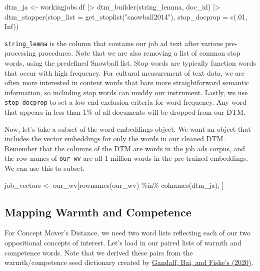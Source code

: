 \documentclass[
  letterpaper,
  DIV=11,
  numbers=noendperiod]{scrreprt}
\newenvironment{Shaded}{\begin{snugshade}}{\end{snugshade}}
\newcommand{\AttributeTok}[1]{\textcolor[rgb]{0.40,0.45,0.13}{#1}}
\newcommand{\ConstantTok}[1]{\textcolor[rgb]{0.56,0.35,0.01}{#1}}
\newcommand{\DecValTok}[1]{\textcolor[rgb]{0.68,0.00,0.00}{#1}}
\newcommand{\FunctionTok}[1]{\textcolor[rgb]{0.28,0.35,0.67}{#1}}
\newcommand{\NormalTok}[1]{\textcolor[rgb]{0.00,0.23,0.31}{#1}}
\newcommand{\OtherTok}[1]{\textcolor[rgb]{0.00,0.23,0.31}{#1}}
\newcommand{\SpecialCharTok}[1]{\textcolor[rgb]{0.37,0.37,0.37}{#1}}
\newcommand{\StringTok}[1]{\textcolor[rgb]{0.13,0.47,0.30}{#1}}
\begin{document}
\begin{Shaded}
\begin{Highlighting}[]
\NormalTok{dtm\_ja }\OtherTok{\textless{}{-}}\NormalTok{ workingjobs.df }\SpecialCharTok{|\textgreater{}}
  \FunctionTok{dtm\_builder}\NormalTok{(string\_lemma, doc\_id) }\SpecialCharTok{|\textgreater{}}
  \FunctionTok{dtm\_stopper}\NormalTok{(}\AttributeTok{stop\_list =} \FunctionTok{get\_stoplist}\NormalTok{(}\StringTok{"snowball2014"}\NormalTok{),}
              \AttributeTok{stop\_docprop =} \FunctionTok{c}\NormalTok{(.}\DecValTok{01}\NormalTok{, }\ConstantTok{Inf}\NormalTok{))}
\end{Highlighting}
\end{Shaded}

\texttt{string\_lemma} is the column that contains our job ad text after
various pre-processing procedures. Note that we are also removing a list
of common stop words, using the predefined Snowball list. Stop words are
typically function words that occur with high frequency. For cultural
measurement of text data, we are often more interested in content words
that bare more straightforward semantic information, so including stop
words can muddy our instrument. Lastly, we use \texttt{stop\_docprop} to
set a low-end exclusion criteria for word frequency. Any word that
appears in less than 1\% of all documents will be dropped from our DTM.

Now, let's take a subset of the word embeddings object. We want an
object that includes the vector embeddings for only the words in our
cleaned DTM. Remember that the columns of the DTM are words in the job
ads corpus, and the row names of \texttt{our\_wv} are all 1 million
words in the pre-trained embeddings. We can use this to subset.

\begin{Shaded}
\begin{Highlighting}[]
\NormalTok{job\_vectors }\OtherTok{\textless{}{-}}\NormalTok{ our\_wv[}\FunctionTok{rownames}\NormalTok{(our\_wv) }\SpecialCharTok{\%in\%} \FunctionTok{colnames}\NormalTok{(dtm\_ja), ]}
\end{Highlighting}
\end{Shaded}

\subsection{Mapping Warmth and
Competence}\label{mapping-warmth-and-competence}

For Concept Mover's Distance, we need two word lists reflecting each of
our two oppositional concepts of interest. Let's load in our paired
lists of warmth and competence words. Note that we derived these pairs
from the warmth/competence seed dictionary created by
\href{https://onlinelibrary.wiley.com/doi/full/10.1002/ejsp.2724?casa_token=gqMHBVmq7eUAAAAA\%3Azr6pilqgfE2nbpJ6yt1aikGXx4GZnenVpTp3F6g9kEPglQqBvFedzgMtbFPuH0mVQ1JUUkzgitZeR6M}{Gandalf,
Bai, and Fiske's (2020)}.
\end{document}

